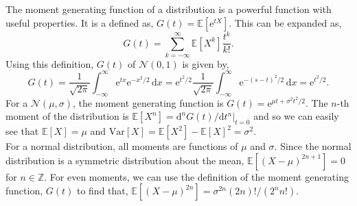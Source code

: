 \documentclass[11pt]{article}
\def\d{\mathrm{d}}
\def\e{\mathrm{e}}
\def\E{\mathbb{E}}
\def\d{\text{d}}
\def\Z{\mathbb{Z}}
\def\e{\text{e}}
\def\N{\mathcal{N}}
\def\var{\mathrm{Var}}
\def\Z{\mathbb{Z}}
\begin{document}
\begin{singlespace}
\begin{tcolorbox}[colback=gray!20!white,colframe=white,arc=8pt,outer arc=8pt]
    The moment generating function of a distribution is a powerful function with useful properties. It is a defined as, $G(t) = \E[\e^{tX}]$. This can be expanded as,
    \[
    G(t) = \sum_{k=-\infty}^{\infty} \E[X^k] \frac{t^k}{k!}.
    \]
    Using this definition, $G(t)$ of $\N(0, 1)$ is given by,
    \[
    G(t) = \frac{1}{\sqrt{2\pi}}\int_{-\infty}^{\infty} \e^{tx} \e^{-x^2/2}\,\d x = \e^{t^2/2} \frac{1}{\sqrt{2\pi}}\int_{-\infty}^{\infty} \e^{-(s-t)^2/2}\,\d x = \e^{t^2/2}.
    \]
    For a $\N(\mu, \sigma)$, the moment generating function is $G(t) = \e^{\mu t + \sigma^2t^2/2}$. The $n$-th moment of the distribution is $\E[X^n] = \d^n G(t)/\d t^n |_{t=0}$ and so we can easily see that $\E[X] = \mu$ and $\var[X] = \E[X^2] - \E[X]^2 = \sigma^2$.\\

    For a normal distribution, all moments are functions of $\mu$ and $\sigma$. Since the normal distribution is a symmetric distribution about the mean, $\E[(X-\mu)^{2n+1}] = 0$ for $n \in \Z$. For even moments, we can use the definition of the moment generating function, $G(t)$ to find that, $\E[(X-\mu)^{2n}] = \sigma^{2n} (2n)!/(2^n n!)$.
\end{tcolorbox}


\end{singlespace}
\end{document}
